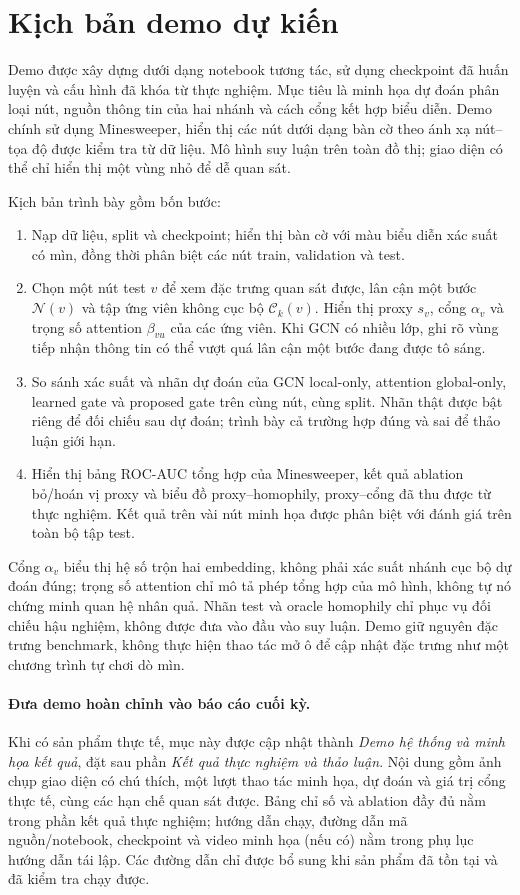 \documentclass[12pt,a4paper]{article}
\numberwithin{equation}{section}
\theoremstyle{definition}
\begin{document}
\section{Kịch bản demo dự kiến}
\label{sec:demo}
Demo được xây dựng dưới dạng notebook tương tác, sử dụng checkpoint đã huấn luyện và cấu hình đã khóa từ thực nghiệm. Mục tiêu là minh họa dự đoán phân loại nút, nguồn thông tin của hai nhánh và cách cổng kết hợp biểu diễn. Demo chính sử dụng Minesweeper, hiển thị các nút dưới dạng bàn cờ theo ánh xạ nút--tọa độ được kiểm tra từ dữ liệu. Mô hình suy luận trên toàn đồ thị; giao diện có thể chỉ hiển thị một vùng nhỏ để dễ quan sát.

Kịch bản trình bày gồm bốn bước:
\begin{enumerate}
    \item Nạp dữ liệu, split và checkpoint; hiển thị bàn cờ với màu biểu diễn xác suất có mìn, đồng thời phân biệt các nút train, validation và test.
    \item Chọn một nút test $v$ để xem đặc trưng quan sát được, lân cận một bước $\mathcal{N}(v)$ và tập ứng viên không cục bộ $\mathcal{C}_k(v)$. Hiển thị proxy $s_v$, cổng $\alpha_v$ và trọng số attention $\beta_{vu}$ của các ứng viên. Khi GCN có nhiều lớp, ghi rõ vùng tiếp nhận thông tin có thể vượt quá lân cận một bước đang được tô sáng.
    \item So sánh xác suất và nhãn dự đoán của GCN local-only, attention global-only, learned gate và proposed gate trên cùng nút, cùng split. Nhãn thật được bật riêng để đối chiếu sau dự đoán; trình bày cả trường hợp đúng và sai để thảo luận giới hạn.
    \item Hiển thị bảng ROC-AUC tổng hợp của Minesweeper, kết quả ablation bỏ/hoán vị proxy và biểu đồ proxy--homophily, proxy--cổng đã thu được từ thực nghiệm. Kết quả trên vài nút minh họa được phân biệt với đánh giá trên toàn bộ tập test.
\end{enumerate}

Cổng $\alpha_v$ biểu thị hệ số trộn hai embedding, không phải xác suất nhánh cục bộ dự đoán đúng; trọng số attention chỉ mô tả phép tổng hợp của mô hình, không tự nó chứng minh quan hệ nhân quả. Nhãn test và oracle homophily chỉ phục vụ đối chiếu hậu nghiệm, không được đưa vào đầu vào suy luận. Demo giữ nguyên đặc trưng benchmark, không thực hiện thao tác mở ô để cập nhật đặc trưng như một chương trình tự chơi dò mìn.

\paragraph{Đưa demo hoàn chỉnh vào báo cáo cuối kỳ.}
Khi có sản phẩm thực tế, mục này được cập nhật thành \textit{Demo hệ thống và minh họa kết quả}, đặt sau phần \textit{Kết quả thực nghiệm và thảo luận}. Nội dung gồm ảnh chụp giao diện có chú thích, một lượt thao tác minh họa, dự đoán và giá trị cổng thực tế, cùng các hạn chế quan sát được. Bảng chỉ số và ablation đầy đủ nằm trong phần kết quả thực nghiệm; hướng dẫn chạy, đường dẫn mã nguồn/notebook, checkpoint và video minh họa (nếu có) nằm trong phụ lục hướng dẫn tái lập. Các đường dẫn chỉ được bổ sung khi sản phẩm đã tồn tại và đã kiểm tra chạy được.
\end{document}

